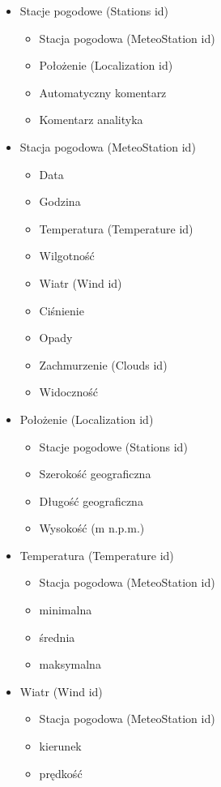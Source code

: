 \documentclass[12pt,a4paper]{article}
\begin{document}
\begin{footnotesize}
\begin{itemize}
\item Stacje pogodowe (Stations id)
    \begin{itemize}
	\item Stacja pogodowa (MeteoStation id)
	\item Położenie (Localization id)
    \item Automatyczny komentarz
    \item Komentarz analityka
    \end{itemize}
\item Stacja pogodowa (MeteoStation id)
    \begin{itemize}
    \item Data
    \item Godzina
    \item Temperatura (Temperature id)
    \item Wilgotność
    \item Wiatr (Wind id)
    \item Ciśnienie
    \item Opady
    \item Zachmurzenie (Clouds id)
    \item Widoczność
    \end{itemize}
\item Położenie (Localization id)
	\begin{itemize}
	\item Stacje pogodowe (Stations id)
	\item Szerokość geograficzna
    \item Długość geograficzna
    \item Wysokość (m n.p.m.)
	\end{itemize}
\item Temperatura (Temperature id)
    \begin{itemize}
    \item Stacja pogodowa (MeteoStation id)
    \item minimalna
    \item średnia
    \item maksymalna
    \end{itemize}
\item Wiatr (Wind id)
    \begin{itemize}
    \item Stacja pogodowa (MeteoStation id)
    \item kierunek
    \item prędkość

\end{itemize}
\end{itemize}
\end{footnotesize}
\end{document}
